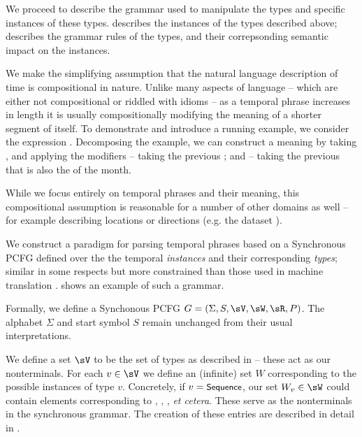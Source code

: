 We proceed to describe the grammar used to manipulate the types and specific
	instances of these types.
 describes the instances of the types described
	above;  describes the grammar rules of the types,
	and their correpsonding semantic impact on the instances.

We make the simplifying assumption that the natural language description
	of time is compositional in nature.
Unlike many aspects of language  -- which are either not compositional or
	riddled with idioms -- as a temporal phrase increases in length it is
	usually compositionally modifying the meaning of a shorter segment of itself.
To demonstrate and introduce a running example, we consider the expression
	.
Decomposing the example, we can construct a meaning by taking ,
	and applying the modifiers  -- taking the previous ;
	and  -- taking the previous  that is
	also the  of the month.

While we focus entirely on temporal phrases and their meaning, this
	compositional assumption is reasonable for a number of other domains as 
	well -- for example describing locations or directions (e.g. the 
	 dataset \needcite).

We construct a paradigm for parsing temporal phrases based on a Synchronous
	PCFG defined over the the temporal \textit{instances} and their
	corresponding \textit{types}; similar in some respects but more
	constrained than those used in machine translation \needcite.
\needfig shows an example of such a grammar.

Formally, we define a Synchonous PCFG 
	$G = \left(\Sigma,S,\sV,\sW,\sR,P\right)$.
The alphabet $\Sigma$ and start symbol $S$ remain unchanged from their
	usual interpretations.

We define a set $\sV$ to be the set of types as described in
	 -- these act as our nonterminals.
For each $v \in \sV$ we define an (infinite) set $W$ corresponding to the 
	possible instances of type $v$.
Concretely, if $v=\textsf{\small{Sequence}}$, our set $W_v \in \sW$ could contain elements
	corresponding to , , ,
	\textit{et cetera}.
These serve as the nonterminals in the synchronous grammar.
The creation of these entries are described in detail in .

